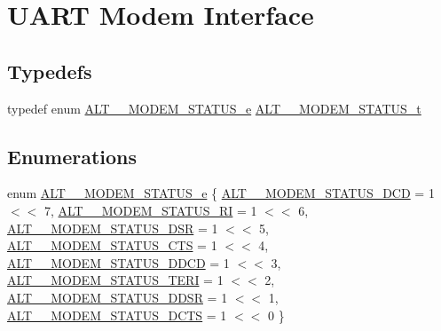 \hypertarget{group__UART__MODEM}{}\section{U\+A\+RT Modem Interface}
\label{group__UART__MODEM}
\subsection*{Typedefs}
\begin{DoxyCompactItemize}
\item 
typedef enum \mbox{\hyperlink{group__UART__MODEM_ga39d4706d540334e2b2e18749187eb3bb}{A\+L\+T\+\_\+\_\+\+M\+O\+D\+E\+M\+\_\+\+S\+T\+A\+T\+U\+S\+\_\+e}} \mbox{\hyperlink{group__UART__MODEM_gae8a7a9a4cb9ef958c03411a3da02f786}{A\+L\+T\+\_\+\_\+\+M\+O\+D\+E\+M\+\_\+\+S\+T\+A\+T\+U\+S\+\_\+t}}
\end{DoxyCompactItemize}
\subsection*{Enumerations}
\begin{DoxyCompactItemize}
\item 
enum \mbox{\hyperlink{group__UART__MODEM_ga39d4706d540334e2b2e18749187eb3bb}{A\+L\+T\+\_\+\_\+\+M\+O\+D\+E\+M\+\_\+\+S\+T\+A\+T\+U\+S\+\_\+e}} \{ \newline
\mbox{\hyperlink{group__UART__MODEM_gga39d4706d540334e2b2e18749187eb3bbafe0c3eb22454e7a49ecb142e6a9d2bc8}{A\+L\+T\+\_\+\_\+\+M\+O\+D\+E\+M\+\_\+\+S\+T\+A\+T\+U\+S\+\_\+\+D\+CD}} = 1 $<$$<$ 7, 
\mbox{\hyperlink{group__UART__MODEM_gga39d4706d540334e2b2e18749187eb3bbaac50d27ab50f2aae4aa5c1091c053b27}{A\+L\+T\+\_\+\_\+\+M\+O\+D\+E\+M\+\_\+\+S\+T\+A\+T\+U\+S\+\_\+\+RI}} = 1 $<$$<$ 6, 
\mbox{\hyperlink{group__UART__MODEM_gga39d4706d540334e2b2e18749187eb3bba4bd9d4e57470267c717181253be93297}{A\+L\+T\+\_\+\_\+\+M\+O\+D\+E\+M\+\_\+\+S\+T\+A\+T\+U\+S\+\_\+\+D\+SR}} = 1 $<$$<$ 5, 
\mbox{\hyperlink{group__UART__MODEM_gga39d4706d540334e2b2e18749187eb3bbacfc495ff68a6b3faec2432f1b2bb1b74}{A\+L\+T\+\_\+\_\+\+M\+O\+D\+E\+M\+\_\+\+S\+T\+A\+T\+U\+S\+\_\+\+C\+TS}} = 1 $<$$<$ 4, 
\newline
\mbox{\hyperlink{group__UART__MODEM_gga39d4706d540334e2b2e18749187eb3bbacde42a60960fa9814ec2eef6e59666cc}{A\+L\+T\+\_\+\_\+\+M\+O\+D\+E\+M\+\_\+\+S\+T\+A\+T\+U\+S\+\_\+\+D\+D\+CD}} = 1 $<$$<$ 3, 
\mbox{\hyperlink{group__UART__MODEM_gga39d4706d540334e2b2e18749187eb3bba5e53b0906eb175912a29b5fdd2713c93}{A\+L\+T\+\_\+\_\+\+M\+O\+D\+E\+M\+\_\+\+S\+T\+A\+T\+U\+S\+\_\+\+T\+E\+RI}} = 1 $<$$<$ 2, 
\mbox{\hyperlink{group__UART__MODEM_gga39d4706d540334e2b2e18749187eb3bba4bac01c15619f04d69de953ce85fe2da}{A\+L\+T\+\_\+\_\+\+M\+O\+D\+E\+M\+\_\+\+S\+T\+A\+T\+U\+S\+\_\+\+D\+D\+SR}} = 1 $<$$<$ 1, 
\mbox{\hyperlink{group__UART__MODEM_gga39d4706d540334e2b2e18749187eb3bba44b9b8fe16aeb62e18a203a28045fdb3}{A\+L\+T\+\_\+\_\+\+M\+O\+D\+E\+M\+\_\+\+S\+T\+A\+T\+U\+S\+\_\+\+D\+C\+TS}} = 1 $<$$<$ 0
 \}
\end{DoxyCompactItemize}
